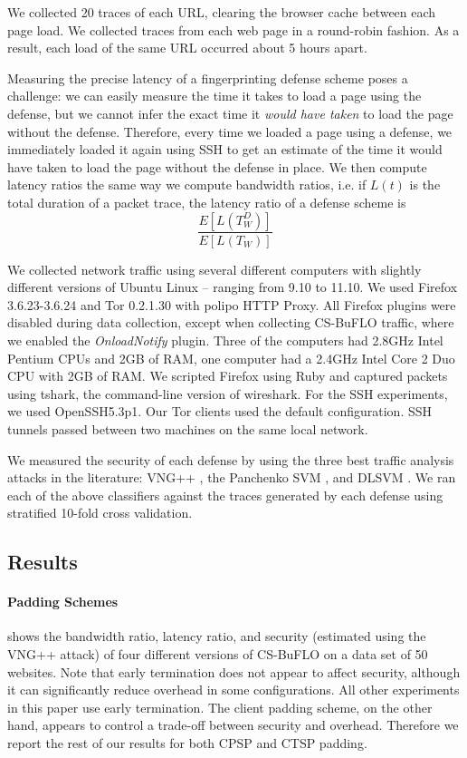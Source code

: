 \documentclass[10pt,journal]{IEEEtran}
\newcommand{\csb} {CS-BuFLO\xspace}
\begin{document}
We collected 20 traces of each URL, clearing the browser cache
between each page load. We collected traces from each web page in a
round-robin fashion.  As a result, each load of the same URL occurred
about 5 hours apart.

Measuring the precise latency of a fingerprinting defense scheme poses a
challenge: we can easily measure the time it takes to load a page
using the defense, but we cannot infer the exact time it \emph{would have
taken} to load the page without the defense.  Therefore, every time we 
loaded a page using a defense, we immediately loaded it again using SSH 
to get an estimate of the time it would have taken to load the page without
the defense in place.  We then compute latency ratios the same way
we compute bandwidth ratios, i.e. if $L(t)$ is the total duration
of a packet trace, the latency ratio of a defense scheme is
\[
\frac{E\left[L(T^D_W)\right]}{E\left[L(T_W)\right]}
\]

We collected network traffic using several different computers with
slightly different versions of Ubuntu Linux -- ranging from 9.10 to
11.10.  We used Firefox 3.6.23-3.6.24 and Tor 0.2.1.30 with polipo
HTTP Proxy. All Firefox plugins were disabled during data collection,
except when collecting \csb traffic, where we enabled the
\textit{OnloadNotify} plugin.  Three of the computers had 2.8GHz Intel
Pentium CPUs and 2GB of RAM, one computer had a 2.4GHz Intel Core 2
Duo CPU with 2GB of RAM.  We scripted Firefox using Ruby and captured
packets using tshark, the command-line version of wireshark.  For the
SSH experiments, we used OpenSSH5.3p1. Our Tor clients used the
default configuration. SSH tunnels passed between two machines on the
same local network.

We measured the security of each defense by using the three best
traffic analysis attacks in the literature: VNG++ \cite{dyer-snp12},
the Panchenko SVM \cite{panchenko-wpes11}, and DLSVM
\cite{cai-ccs12}. We ran each of the above classifiers against 
the traces generated by each defense using stratified 10-fold cross 
validation.

\subsection{Results}
\label{subsec:results}





\paragraph*{Padding Schemes}  shows 
the bandwidth ratio, latency ratio, and security (estimated
using the VNG++ attack) of four different versions of \csb on a data
set of 50 websites.  Note that early termination does not appear to
affect security, although it can significantly reduce overhead in some
configurations.  All other experiments in this paper use early
termination.  The client padding scheme, on the other hand, appears to
control a trade-off between security and overhead.  Therefore we
report the rest of our results for both CPSP and CTSP padding.
\end{document}
